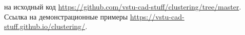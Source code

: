 
 на исходный код \url{https://github.com/vstu-cad-stuff/clustering/tree/master}.\\
Ссылка на демонстрационные примеры \url{https://vstu-cad-stuff.github.io/clustering/}.

%
%
%
%
%
%
%
%
%
%
%
%
